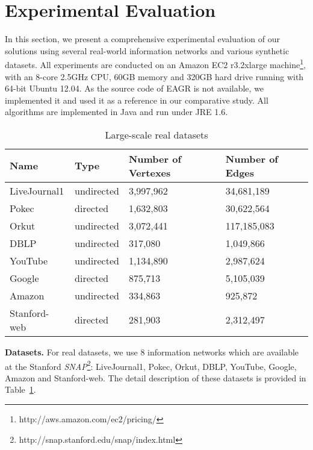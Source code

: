 \section{Experimental Evaluation}\label{sec:experiments}
In this section, we present a comprehensive experimental evaluation 
of our solutions using several real-world information networks and 
various synthetic datasets. 
All experiments are conducted on an 
Amazon EC2 r3.2xlarge machine\footnote{http://aws.amazon.com/ec2/pricing/}, 
with an 8-core 2.5GHz CPU, 60GB memory and 320GB hard drive 
running with 64-bit Ubuntu 12.04. As the source code of EAGR is not
available, we implemented it and used it as a reference in our comparative
study.  
All algorithms are implemented in Java and run under JRE 1.6.

\begin{table}[h]
\caption{Large-scale real datasets}
\label{tab:realdata}
\centering
\begin{tabular}{|l|l|l|l|}
\hline 
\rule[-1ex]{0pt}{2.5ex} Name & Type & Number of Vertexes & Number of Edges \\ 
\hline 
\rule[-1ex]{0pt}{2.5ex} LiveJournal1 & undirected & 3,997,962 & 34,681,189 \\ 
\hline 
\rule[-1ex]{0pt}{2.5ex} Pokec & directed & 1,632,803 & 30,622,564 \\ 
\hline 
\rule[-1ex]{0pt}{2.5ex} Orkut & undirected & 3,072,441 & 117,185,083 \\ 
\hline 
\rule[-1ex]{0pt}{2.5ex} DBLP & undirected & 317,080 & 1,049,866 \\ 
\hline 
\rule[-1ex]{0pt}{2.5ex} YouTube & undirected & 1,134,890 & 2,987,624 \\ 
\hline 
\rule[-1ex]{0pt}{2.5ex} Google & directed & 875,713 & 5,105,039 \\ 
\hline 
\rule[-1ex]{0pt}{2.5ex} Amazon & undirected & 334,863 & 925,872 \\ 
\hline 
\rule[-1ex]{0pt}{2.5ex} Stanford-web & directed & 281,903 &  2,312,497 \\ 
\hline 
\end{tabular}
\end{table}


\textbf{Datasets.} For real datasets, we use 8 information networks 
which are available at the Stanford \emph{SNAP}\footnote{http://snap.stanford.edu/snap/index.html}: 
LiveJournal1, Pokec, Orkut, DBLP, YouTube, Google, Amazon and Stanford-web. 
The detail description of these datasets is provided in 
Table~\ref{tab:realdata}. 

